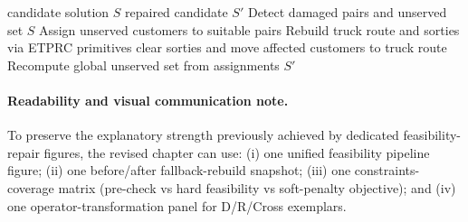 \documentclass[review,12pt]{elsarticle}
\begin{document}
\begin{algorithm}[t]
\caption{Feasibility Safeguard and Fallback Rebuild}
\label{alg:fallback}
\begin{algorithmic}[1]
\Require candidate solution \(S\)
\Ensure repaired candidate \(S'\)
\State Detect damaged pairs and unserved set
  \State \Return \(S\)
\EndIf
\State Assign unserved customers to suitable pairs
  \State Rebuild truck route and sorties via ETPRC primitives
    \State clear sorties and move affected customers to truck route
  \EndIf
\EndFor
\State Recompute global unserved set from assignments
\State \Return \(S'\)
\end{algorithmic}
\end{algorithm}

\paragraph{Readability and visual communication note.}
To preserve the explanatory strength previously achieved by dedicated feasibility-repair figures, the revised chapter can use: (i) one unified feasibility pipeline figure; (ii) one before/after fallback-rebuild snapshot; (iii) one constraints-coverage matrix (pre-check vs hard feasibility vs soft-penalty objective); and (iv) one operator-transformation panel for D/R/Cross exemplars.
\end{document}
